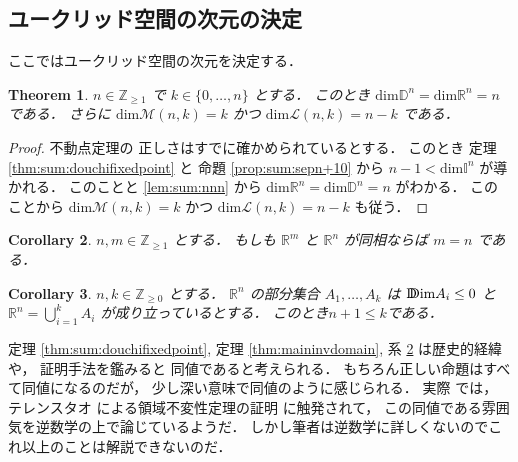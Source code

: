 \documentclass[leqno, a4paper, 12pt]{jsarticle}
\theoremstyle{plain}
\newtheorem{thm}{Theorem}[section]
\newtheorem{cor}[thm]{Corollary}
\theoremstyle{definition}
\theoremstyle{remark}
\newcommand{\zz}{\mathbb{Z}}
\newcommand{\rr}{\mathbb{R}}
\newcommand{\yoddim}{\mathrm{D\hspace{-5.5pt}Dim}}
\newcommand{\yodim}{\mathrm{dim}}
\newcommand{\yospfont}[1]{\mathbb{#1}}
\newcommand{\yodisc}[1]{\yospfont{D}^{#1}}
\newcommand{\yocube}[1]{\yospfont{I}^{#1}}
\newcommand{\yospspfont}{\mathscr}
\newcommand{\yommsp}[2]{\yospspfont{M}({#1}, {#2})}
\newcommand{\yollsp}[2]{\yospspfont{L}({#1}, {#2})}
\numberwithin{equation}{section}
\begin{document}
\subsection{ユークリッド空間の次元の決定}
ここではユークリッド空間の次元を決定する．

\begin{thm}\label{thm:sum:jigen}
$n\in \zz_{\ge 1}$
で
$k\in \{0, \dots, n\}$
とする．
このとき
$\yodim \yodisc{n}=
\yodim \rr^{n}=n$
である．
さらに
$\yodim \yommsp{n}{k}=k$
かつ
$\yodim \yollsp{n}{k} = n- k$
である．
\end{thm}
\begin{proof}
不動点定理の
正しさはすでに確かめられているとする．
このとき
定理
\ref{thm:sum:douchifixedpoint}
と
命題
\ref{prop:sum:sepn+10}
から
$n-1<\yodim \yocube{n}$
が導かれる．
このことと
\ref{lem:sum:nnn}
から
$\yodim \rr^{n}=\yodim \yodisc{n}=n$
がわかる．
このことから
$\yodim \yommsp{n}{k}=k$
かつ
$\yodim \yollsp{n}{k} = n- k$
も従う．
\end{proof}

\begin{cor}\label{cor:sum:mnonaji}
$n, m\in \zz_{\ge 1}$
とする．
もしも
$\rr^{m}$
と
$\rr^{n}$
が同相ならば
$m=n$
である．
\end{cor}



\begin{cor}\label{cor:sum:decomp333}
$n, k\in \zz_{\ge 0}$
とする．
$\rr^{n}$
の部分集合
$A_{1}, \dots, A_{k}$
は
$\yoddim A_{i}\le 0$
と
$\rr^{n}=\bigcup_{i=1}^{k}A_{i}$
が成り立っているとする．
このとき$n+1\le k$である．
\end{cor}


定理
\ref{thm:sum:douchifixedpoint}, 
定理
\ref{thm:maininvdomain}, 
系 
\ref{cor:sum:mnonaji}
は歴史的経緯や，
証明手法を鑑みると
同値であると考えられる．
もちろん正しい命題はすべて同値になるのだが，
少し深い意味で同値のように感じられる．
実際
\cite{zbMATH07276287}
では，
テレンスタオ
による領域不変性定理の証明
\cite{tao2011brouwer}
に触発されて，
この同値である雰囲気を逆数学の上で論じているようだ．
しかし筆者は逆数学に詳しくないのでこれ以上のことは解説できないのだ．





\end{document}
